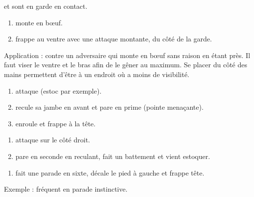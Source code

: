 \begin{technique}

\A et \D sont en garde en contact.

\begin{enumerate}
	\item \A monte en bœuf.
	
	\item \D frappe \A au ventre avec une attaque montante, du côté de la garde.
\end{enumerate}

Application : contre un adversaire qui monte en bœuf sans raison en étant près.
Il faut viser le ventre et le bras afin de le gêner au maximum. Se placer du côté des mains permettent d'être à un endroit où \A a moins de visibilité.

\end{technique}


\begin{technique}

\begin{enumerate}
	\item \A attaque (estoc par exemple).
	
	\item \D recule sa jambe en avant et pare en prime (pointe menaçante).
	
	\item \D enroule et frappe à la tête.
\end{enumerate}

\end{technique}


\begin{technique}

\begin{enumerate}
	\item \A attaque sur le côté droit.
	
	\item \D pare en seconde en reculant, fait un battement et vient estoquer.
\end{enumerate}

\end{technique}


\begin{technique}

\begin{enumerate}
	\item \D fait une parade en sixte, décale le pied à gauche et frappe tête.
\end{enumerate}

Exemple : fréquent en parade instinctive.

\end{technique}


